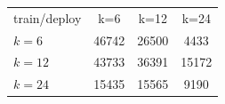 \begin{tabular}{lccc}
\hline
train/deploy & k=6 & k=12 & k=24\\
$k=6$ & 46742 & 26500 & 4433\\
$k=12$ & 43733 & 36391 & 15172\\
$k=24$ & 15435 & 15565 & 9190\\
\hline
\end{tabular}